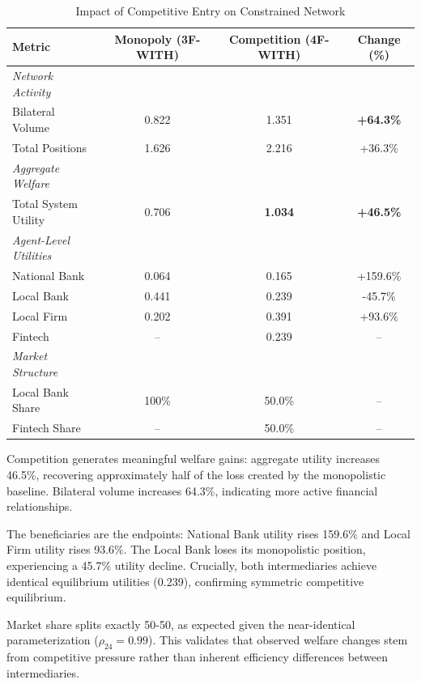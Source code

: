 \documentclass[12pt]{article}
\begin{document}
\begin{table}[h]
\centering
\caption{Impact of Competitive Entry on Constrained Network}
\label{tab:competition_results}
\begin{tabular}{lccc}
\toprule
\textbf{Metric} & \textbf{Monopoly (3F-WITH)} & \textbf{Competition (4F-WITH)} & \textbf{Change (\%)} \\
\midrule
\textit{Network Activity} & & & \\
\quad Bilateral Volume & 0.822 & 1.351 & \textbf{+64.3\%} \\
\quad Total Positions & 1.626 & 2.216 & +36.3\% \\
\midrule
\textit{Aggregate Welfare} & & & \\
\quad Total System Utility & 0.706 & \textbf{1.034} & \textbf{+46.5\%} \\
\midrule
\textit{Agent-Level Utilities} & & & \\
\quad National Bank & 0.064 & 0.165 & +159.6\% \\
\quad Local Bank & 0.441 & 0.239 & -45.7\% \\
\quad Local Firm & 0.202 & 0.391 & +93.6\% \\
\quad Fintech & -- & 0.239 & -- \\
\midrule
\textit{Market Structure} & & & \\
\quad Local Bank Share & 100\% & 50.0\% & -- \\
\quad Fintech Share & -- & 50.0\% & -- \\
\bottomrule
\end{tabular}
\end{table}

Competition generates meaningful welfare gains: aggregate utility increases 46.5\%, recovering approximately half of the loss created by the monopolistic baseline. Bilateral volume increases 64.3\%, indicating more active financial relationships.

The beneficiaries are the endpoints: National Bank utility rises 159.6\% and Local Firm utility rises 93.6\%. The Local Bank loses its monopolistic position, experiencing a 45.7\% utility decline. Crucially, both intermediaries achieve identical equilibrium utilities (0.239), confirming symmetric competitive equilibrium.

Market share splits exactly 50-50, as expected given the near-identical parameterization ($\rho_{24} = 0.99$). This validates that observed welfare changes stem from competitive pressure rather than inherent efficiency differences between intermediaries.
\end{document}
